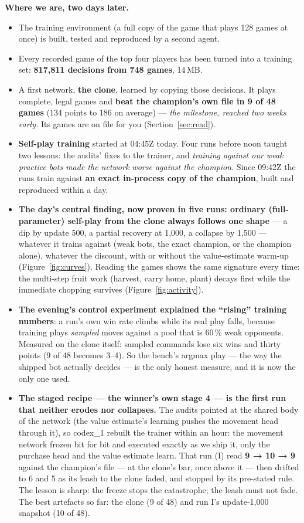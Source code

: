 \documentclass[11pt,a4paper]{article}
\begin{document}
\textbf{Where we are, two days later.}
\begin{itemize}[nosep,leftmargin=1.4em]
  \item The training environment (a full copy of the game that plays 128 games at once) is built, tested and reproduced by a second agent.
  \item Every recorded game of the top four players has been turned into a training set: \textbf{817,811 decisions from 748 games}, 14\,MB.
  \item A first network, \textbf{the clone}, learned by copying those decisions. It plays complete, legal games and \textbf{beat the champion's own file in 9 of 48 games} (134 points to 186 on average) --- \emph{the milestone, reached two weeks early.} Its games are on file for you (Section~\ref{sec:read}).
  \item \textbf{Self-play training} started at 04:45Z today. Four runs before noon taught two lessons: the audits' fixes to the trainer, and \emph{training against our weak practice bots made the network worse against the champion}. Since 09:42Z the runs train against \textbf{an exact in-process copy of the champion}, built and reproduced within a day.
  \item \textbf{The day's central finding, now proven in five runs: ordinary (full-parameter) self-play from the clone always follows one shape} --- a dip by update 500, a partial recovery at 1,000, a collapse by 1,500 --- whatever it trains against (weak bots, the exact champion, or the champion alone), whatever the discount, with or without the value-estimate warm-up (Figure~\ref{fig:curves}). Reading the games shows the same signature every time: the multi-step fruit work (harvest, carry home, plant) decays first while the immediate chopping survives (Figure~\ref{fig:activity}).
  \item \textbf{The evening's control experiment explained the ``rising'' training numbers}: a run's own win rate climbs while its real play falls, because training plays \emph{sampled} moves against a pool that is 60\,\% weak opponents. Measured on the clone itself: sampled commands lose six wins and thirty points (9 of 48 becomes 3--4). So the bench's argmax play --- the way the shipped bot actually decides --- is the only honest measure, and it is now the only one used.
  \item \textbf{The staged recipe --- the winner's own stage 4 --- is the first run that neither erodes nor collapses.} The audits pointed at the shared body of the network (the value estimate's learning pushes the movement head through it), so codex\_1 rebuilt the trainer within an hour: the movement network frozen bit for bit and executed exactly as we ship it, only the purchase head and the value estimate learn. That run (I) read \textbf{9 → 10 → 9} against the champion's file --- at the clone's bar, once above it --- then drifted to 6 and 5 as its leash to the clone faded, and stopped by its pre-stated rule. The lesson is sharp: the freeze stops the catastrophe; the leash must not fade. The best artefacts so far: the clone (9 of 48) and run I's update-1,000 snapshot (10 of 48).

\end{itemize}
\end{document}

